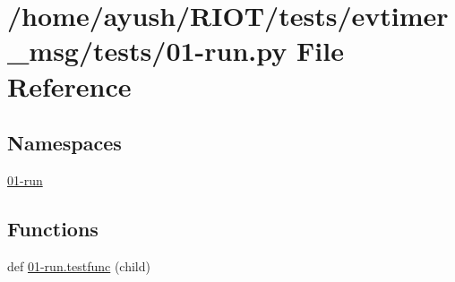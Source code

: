 \hypertarget{evtimer__msg_2tests_201-run_8py}{}\section{/home/ayush/\+R\+I\+O\+T/tests/evtimer\+\_\+msg/tests/01-\/run.py File Reference}
\label{evtimer__msg_2tests_201-run_8py}
\subsection*{Namespaces}
\begin{DoxyCompactItemize}
\item 
 \hyperlink{namespace01-run}{01-\/run}
\end{DoxyCompactItemize}
\subsection*{Functions}
\begin{DoxyCompactItemize}
\item 
def \hyperlink{namespace01-run_aff983ffd4ab0e6bf8e7e58970e4a10bb}{01-\/run.\+testfunc} (child)
\end{DoxyCompactItemize}
